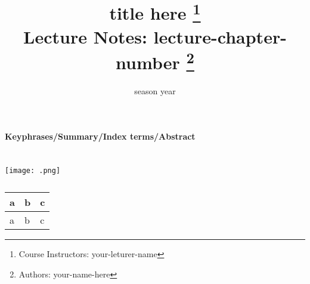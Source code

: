 \documentclass{tufte-handout}
\title{title here
       \thanks{Course Instructors: your-leturer-name} \\
       \Large Lecture Notes: lecture-chapter-number \thanks{Authors: your-name-here}}
\date{season year}                                %
\begin{document}
\maketitle


\textbf{Keyphrases/Summary/Index terms/Abstract}

\section{}

\begin{marginfigure}%
  \texttt{[image: .png]}
  \caption{}
\end{marginfigure}

\begin{table}[ht]
  \centering
  \selectfont
  \begin{tabular}{lll}
    \toprule
    a & b & c \\
    \midrule
    a & b & c \\
    \bottomrule
  \end{tabular}
  \caption{}
\end{table}
\end{document}
